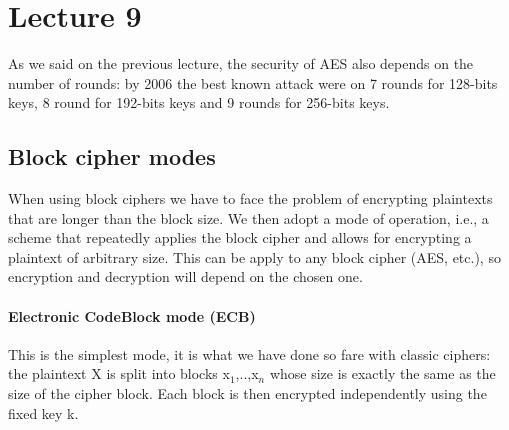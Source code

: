 \documentclass[a4paper, 12pt]{report}
\begin{document}
\chapter*{Lecture 9}
As we said on the previous lecture, the security of AES also depends on the number of rounds: by 2006 the best known attack were on 7 rounds for 128-bits keys, 8 round for 192-bits keys and 9 rounds for 256-bits keys.

\section*{Block cipher modes}
When using block ciphers we have to face the problem of encrypting plaintexts that are longer than the block size. We then adopt a mode of operation, i.e., a scheme that repeatedly applies the block cipher and allows for encrypting a plaintext of arbitrary size. This can be apply to any block cipher (AES, etc.), so encryption and decryption will depend on the chosen one.


\subsubsection{Electronic CodeBlock mode (ECB)}
This is the simplest mode, it is what we have done so fare with classic ciphers: the plaintext X is split into blocks x$_1$,..,x$_n$ whose size is exactly the same as the size of the cipher block. Each block is then encrypted independently using the fixed key k.
\end{document}
